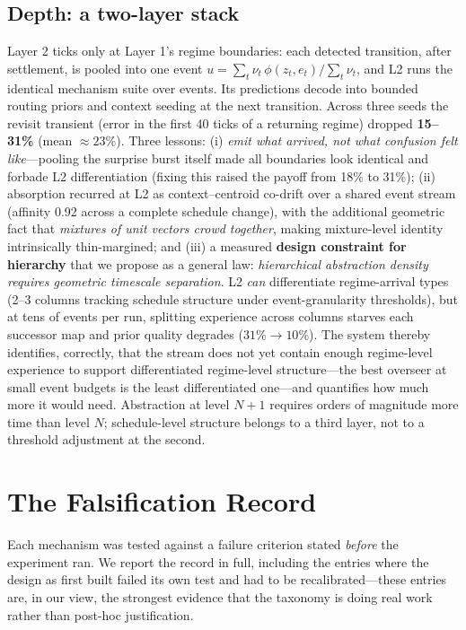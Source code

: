 \documentclass[11pt]{article}
\begin{document}
\subsection{Depth: a two-layer stack}
\label{sec:depth}

Layer 2 ticks only at Layer 1's regime boundaries: each detected
transition, after settlement, is pooled into one event
$u = \sum_t \nu_t\,\phi(z_t, e_t) / \sum_t \nu_t$, and L2 runs the identical
mechanism suite over events. Its predictions decode into bounded routing
priors and context seeding at the next transition. Across three seeds the
revisit transient (error in the first 40 ticks of a returning regime)
dropped \textbf{15--31\%} (mean $\approx 23\%$). Three lessons: (i)
\emph{emit what arrived, not what confusion felt like}---pooling the
surprise burst itself made all boundaries look identical and forbade L2
differentiation (fixing this raised the payoff from 18\% to 31\%); (ii)
absorption recurred at L2 as context--centroid co-drift over a shared event
stream (affinity 0.92 across a complete schedule change), with the
additional geometric fact that \emph{mixtures of unit vectors crowd
together}, making mixture-level identity intrinsically thin-margined; and
(iii) a measured \textbf{design constraint for hierarchy} that we propose
as a general law: \emph{hierarchical abstraction density requires geometric
timescale separation}. L2 \emph{can} differentiate regime-arrival types
(2--3 columns tracking schedule structure under event-granularity
thresholds), but at tens of events per run, splitting experience across
columns starves each successor map and prior quality degrades ($31\% \to
10\%$). The system thereby identifies, correctly, that the stream does not
yet contain enough regime-level experience to support differentiated
regime-level structure---the best overseer at small event budgets is the
least differentiated one---and quantifies how much more it would need.
Abstraction at level $N{+}1$ requires orders of magnitude more time than
level $N$; schedule-level structure belongs to a third layer, not to a
threshold adjustment at the second.

\section{The Falsification Record}
\label{sec:falsification}

Each mechanism was tested against a failure criterion stated \emph{before}
the experiment ran. We report the record in full, including the entries
where the design as first built failed its own test and had to be
recalibrated---these entries are, in our view, the strongest evidence that
the taxonomy is doing real work rather than post-hoc justification.
\end{document}
